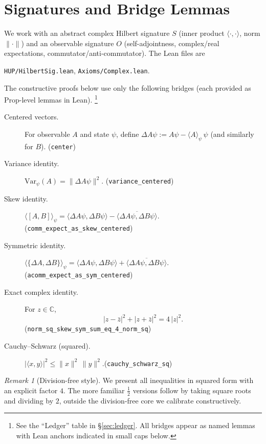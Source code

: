 \documentclass[11pt]{article}
\newcommand{\lean}[1]{\texttt{#1}}
\newcommand{\C}{\mathbb{C}}
\newcommand{\ip}[2]{\langle #1, #2 \rangle}
\newcommand{\E}[1]{\langle #1 \rangle}
\newcommand{\comm}[2]{[#1, #2]}
\newcommand{\acomm}[2]{\{#1, #2\}} %
\newcommand{\absC}[1]{\left| #1 \right|}
\newcommand{\abssq}[1]{\absC{#1}^{2}}
\newcommand{\Var}{\mathrm{Var}}
\theoremstyle{plain}
\theoremstyle{definition}
\theoremstyle{remark}
\newtheorem{remark}[theorem]{Remark}
\begin{document}
\section{Signatures and Bridge Lemmas}
\label{sec:signatures-bridges}

We work with an abstract complex Hilbert signature $S$ (inner product $\ip{\cdot}{\cdot}$, norm $\|\cdot\|$) and an observable signature $O$ (self-adjointness, complex/real expectations, commutator/anti-commutator). The Lean files are
\begin{center}
\texttt{HUP/HilbertSig.lean},\quad
\texttt{Axioms/Complex.lean}.
\end{center}
The constructive proofs below use only the following bridges (each provided as Prop-level lemmas in Lean).%
\footnote{See the ``Ledger'' table in \S\ref{sec:ledger}. All bridges appear as named lemmas with Lean anchors indicated in small caps below.}

\begin{description}
  \item[Centered vectors.] For observable $A$ and state $\psi$, define
  $\Delta A\psi := A\psi - \E{A}_\psi\,\psi$ (and similarly for $B$). \hfill{\small(\lean{center})}
  \item[Variance identity.] $\Var_\psi(A) = \|\Delta A\psi\|^2$. \hfill{\small(\lean{variance\_centered})}
  \item[Skew identity.] $\E{\comm{A}{B}}_\psi = \ip{\Delta A\psi}{\Delta B\psi} - \overline{\ip{\Delta A\psi}{\Delta B\psi}}$. \hfill{\small(\lean{comm\_expect\_as\_skew\_centered})}
  \item[Symmetric identity.] $\E{\acomm{\Delta A}{\Delta B}}_\psi = \ip{\Delta A\psi}{\Delta B\psi} + \overline{\ip{\Delta A\psi}{\Delta B\psi}}$. \hfill{\small(\lean{acomm\_expect\_as\_sym\_centered})}
  \item[Exact complex identity.] For $z\in\C$,
  \[
    \abssq{z-\bar z} + \abssq{z+\bar z} = 4\,\abssq{z}.
  \]
  \hfill{\small(\lean{norm\_sq\_skew\_sym\_sum\_eq\_4\_norm\_sq})}
  \item[Cauchy--Schwarz (squared).] $\abssq{\ip{x}{y}} \le \|x\|^2\,\|y\|^2$.\hfill{\small(\lean{cauchy\_schwarz\_sq})}
\end{description}

\begin{remark}[Division-free style]
We present all inequalities in squared form with an explicit factor $4$.
The more familiar $\tfrac12$ versions follow by taking square roots and dividing by $2$, outside the division-free core we calibrate constructively.
\end{remark}
\end{document}
